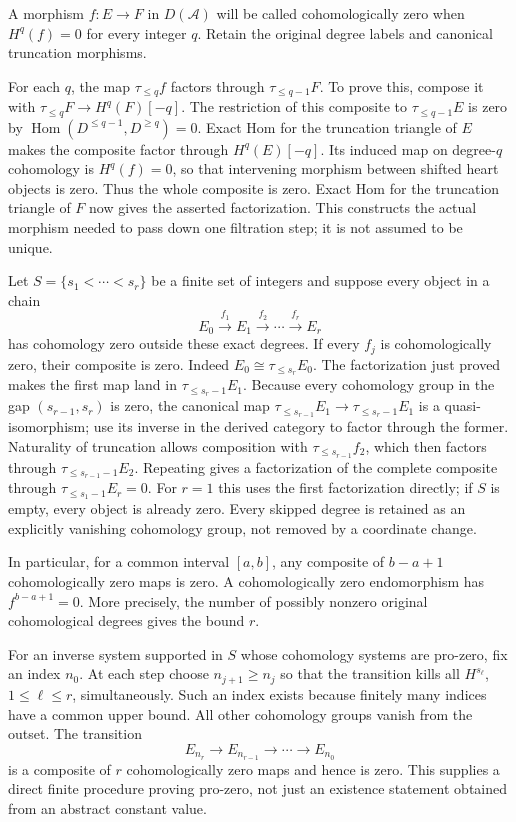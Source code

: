 A morphism \(f:E\to F\) in \(D(\mathcal A)\) will be called cohomologically zero when \(H^q(f)=0\) for every integer \(q\). Retain the original degree labels and canonical truncation morphisms.

For each \(q\),\allowbreak{} the map \(\tau_{\leq q}f\) factors through \(\tau_{\leq q-1}F\). To prove this,\allowbreak{} compose it with \(\tau_{\leq q}F\to H^q(F)[-q]\). The restriction of this composite to \(\tau_{\leq q-1}E\) is zero by \(\operatorname{Hom}(D^{\leq q-1},D^{\geq q})=0\). Exact Hom for the truncation triangle of \(E\) makes the composite factor through \(H^q(E)[-q]\). Its induced map on degree-\(q\) cohomology is \(H^q(f)=0\),\allowbreak{} so that intervening morphism between shifted heart objects is zero. Thus the whole composite is zero. Exact Hom for the truncation triangle of \(F\) now gives the asserted factorization. This constructs the actual morphism needed to pass down one filtration step; it is not assumed to be unique.

Let \(S=\{s_1<\cdots<s_r\}\) be a finite set of integers and suppose every object in a chain \[
E_0\xrightarrow{f_1}E_1\xrightarrow{f_2}\cdots
 \xrightarrow{f_r}E_r
\] has cohomology zero outside these exact degrees. If every \(f_j\) is cohomologically zero,\allowbreak{} their composite is zero. Indeed \(E_0\cong\tau_{\leq s_r}E_0\). The factorization just proved makes the first map land in \(\tau_{\leq s_r-1}E_1\). Because every cohomology group in the gap \((s_{r-1},s_r)\) is zero,\allowbreak{} the canonical map \(\tau_{\leq s_{r-1}}E_1\to\tau_{\leq s_r-1}E_1\) is a quasi-isomorphism; use its inverse in the derived category to factor through the former. Naturality of truncation allows composition with \(\tau_{\leq s_{r-1}}f_2\),\allowbreak{} which then factors through \(\tau_{\leq s_{r-1}-1}E_2\). Repeating gives a factorization of the complete composite through \(\tau_{\leq s_1-1}E_r=0\). For \(r=1\) this uses the first factorization directly; if \(S\) is empty,\allowbreak{} every object is already zero. Every skipped degree is retained as an explicitly vanishing cohomology group,\allowbreak{} not removed by a coordinate change.

In particular,\allowbreak{} for a common interval \([a,b]\),\allowbreak{} any composite of \(b-a+1\) cohomologically zero maps is zero. A cohomologically zero endomorphism has \(f^{b-a+1}=0\). More precisely,\allowbreak{} the number of possibly nonzero original cohomological degrees gives the bound \(r\).

For an inverse system supported in \(S\) whose cohomology systems are pro-zero,\allowbreak{} fix an index \(n_0\). At each step choose \(n_{j+1}\geq n_j\) so that the transition kills all \(H^{s_\ell}\),\allowbreak{} \(1\leq\ell\leq r\),\allowbreak{} simultaneously. Such an index exists because finitely many indices have a common upper bound. All other cohomology groups vanish from the outset. The transition \[
E_{n_r}\longrightarrow E_{n_{r-1}}\longrightarrow\cdots
 \longrightarrow E_{n_0}
\] is a composite of \(r\) cohomologically zero maps and hence is zero. This supplies a direct finite procedure proving pro-zero,\allowbreak{} not just an existence statement obtained from an abstract constant value.

